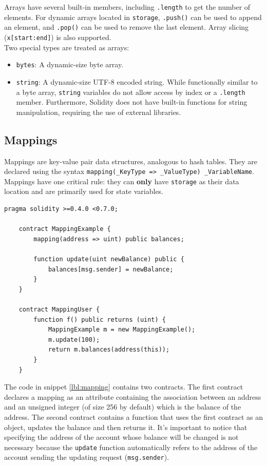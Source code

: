 \documentclass{scrbook}
\begin{document}
Arrays have several built-in members, including \texttt{.length} to get the number of elements. For dynamic arrays located in \texttt{storage}, \texttt{.push()} can be used to append an element, and \texttt{.pop()} can be used to remove the last element. Array slicing (\texttt{x[start:end]}) is also supported.\\

Two special types are treated as arrays:

\begin{itemize}
    \item \texttt{bytes}: A dynamic-size byte array.
    
    \item \texttt{string}: A dynamic-size UTF-8 encoded string. While functionally similar to a byte array, \texttt{string} variables do not allow access by index or a \texttt{.length} member. Furthermore, Solidity does not have built-in functions for string manipulation, requiring the use of external libraries.
\end{itemize}

\subsection{Mappings}

Mappings are key-value pair data structures, analogous to hash tables. They are declared using the syntax \texttt{mapping(\_KeyType => \_ValueType) \_VariableName}. Mappings have one critical rule: they can \textbf{only} have \texttt{storage} as their data location and are primarily used for state variables.

\begin{lstlisting}[caption={Example of mapping declaration and usage}, label={lbl:mapping}]
    pragma solidity >=0.4.0 <0.7.0;
    
    contract MappingExample {
        mapping(address => uint) public balances;
        
        function update(uint newBalance) public {
            balances[msg.sender] = newBalance;
        }
    }
    
    contract MappingUser {
        function f() public returns (uint) {
            MappingExample m = new MappingExample();
            m.update(100);
            return m.balances(address(this));
        }
    }
\end{lstlisting}

The code in snippet \ref{lbl:mapping} contains two contracts. The first contract declares a mapping as an attribute containing the association between an address and an unsigned integer (of size 256 by default) which is the balance of the address. The second contract contains a function that uses the first contract as an object, updates the balance and then returns it. It's important to notice that specifying the address of the account whose balance will be changed is not necessary because the \texttt{update} function automatically refers to the address of the account sending the updating request (\texttt{msg.sender}).
\end{document}
